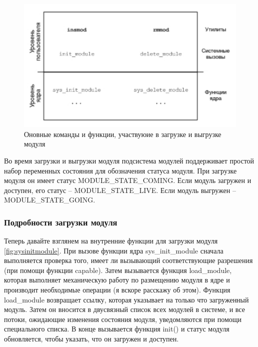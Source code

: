 \begin{figure}[H]
	\centering
	\includegraphics[width=0.7\linewidth]{src/img/commands_functions}
	\caption{Оновные команды и функции, участвуюие в загрузке и выгрузке модуля}
	\label{fig:commandsfunctions}
\end{figure}

Во время загрузки и выгрузки модуля подсистема модулей поддерживает простой набор переменных состояния для обозначения статуса модуля. 
При загрузке модуля он имеет статус MODULE\_STATE\_COMING. Если модуль загружен и доступен, его статус – MODULE\_STATE\_LIVE. Если модуль выгружен – MODULE\_STATE\_GOING.

\subsubsection{Подробности загрузки модуля}
Теперь давайте взглянем на внутренние функции для загрузки модуля \ref{fig:sysinitmodule}. 
При вызове функции ядра sys\_init\_module сначала выполняется проверка того, имеет ли вызывающий соответствующие разрешения (при помощи функции capable). 
Затем вызывается функция load\_module, которая выполняет механическую работу по размещению модуля в ядре и производит необходимые операции (я вскоре расскажу об этом). 
Функция load\_module возвращает ссылку, которая указывает на только что загруженный модуль. 
Затем он вносится в двусвязный список всех модулей в системе, и все потоки, ожидающие изменения состояния модуля, уведомляются при помощи специального списка. 
В конце вызывается функция init() и статус модуля обновляется, чтобы указать, что он загружен и доступен.

